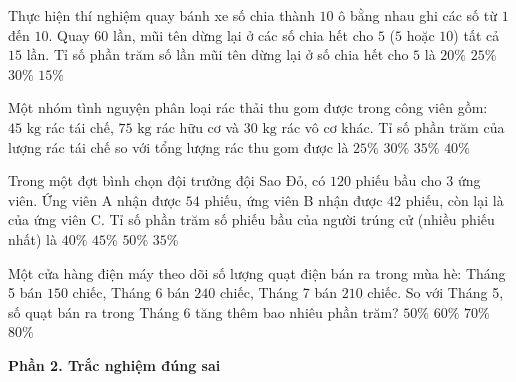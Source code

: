 \begin{ex} %
Thực hiện thí nghiệm quay bánh xe số chia thành $10$ ô bằng nhau ghi các số từ $1$ đến $10$. Quay $60$ lần, mũi tên dừng lại ở các số chia hết cho $5$ ($5$ hoặc $10$) tất cả $15$ lần. Tỉ số phần trăm số lần mũi tên dừng lại ở số chia hết cho $5$ là
\choice
{$20\%$}
{\True $25\%$}
{$30\%$}
{$15\%$}
\end{ex}

\begin{ex} %
Một nhóm tình nguyện phân loại rác thải thu gom được trong công viên gồm: $45\text{ kg}$ rác tái chế, $75\text{ kg}$ rác hữu cơ và $30\text{ kg}$ rác vô cơ khác. Tỉ số phần trăm của lượng rác tái chế so với tổng lượng rác thu gom được là
\choice
{$25\%$}
{\True $30\%$}
{$35\%$}
{$40\%$}
\end{ex}

\begin{ex} %
Trong một đợt bình chọn đội trưởng đội Sao Đỏ, có $120$ phiếu bầu cho $3$ ứng viên. Ứng viên A nhận được $54$ phiếu, ứng viên B nhận được $42$ phiếu, còn lại là của ứng viên C. Tỉ số phần trăm số phiếu bầu của người trúng cử (nhiều phiếu nhất) là
\choice
{$40\%$}
{\True $45\%$}
{$50\%$}
{$35\%$}
\end{ex}

\begin{ex} %
Một cửa hàng điện máy theo dõi số lượng quạt điện bán ra trong mùa hè: Tháng 5 bán $150$ chiếc, Tháng 6 bán $240$ chiếc, Tháng 7 bán $210$ chiếc. So với Tháng 5, số quạt bán ra trong Tháng 6 tăng thêm bao nhiêu phần trăm?
\choice
{$50\%$}
{\True $60\%$}
{$70\%$}
{$80\%$}
\end{ex}

\textbf{Phần 2. Trắc nghiệm đúng sai}

